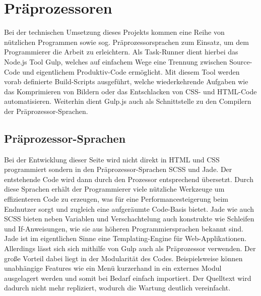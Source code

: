 \section{Präprozessoren}
Bei der technischen Umsetzung dieses Projekts kommen eine Reihe von nützlichen Programmen sowie sog. Präprozessorsprachen zum Einsatz, um dem Programmierer die Arbeit zu erleichtern.
Als Task-Runner dient hierbei das Node.js Tool Gulp, welches auf einfachem Wege eine Trennung zwischen Source-Code und eigentlichem Produktiv-Code ermöglicht. Mit diesem Tool werden vorab definierte Build-Scripts ausgeführt, welche wiederkehrende Aufgaben wie das Komprimieren von Bildern oder das Entschlacken von CSS- und HTML-Code automatisieren. Weiterhin dient Gulp.js auch als Schnittstelle zu den Compilern der Präprozessor-Sprachen.

\subsection{Präprozessor-Sprachen}
Bei der Entwicklung dieser Seite wird nicht direkt in HTML und CSS programmiert sondern in den Präprozessor-Sprachen SCSS und Jade. Der entstehende Code wird dann durch den Prozessor entsprechend übersetzt.
Durch diese Sprachen erhält der Programmierer viele nützliche Werkzeuge um effizienteren Code zu erzeugen, was für eine Performancesteigerung beim Endnutzer sorgt und zugleich eine aufgeräumte Code-Basis bietet.
Jade wie auch SCSS bieten neben Variablen und Verschachtelung auch konstrukte wie Schleifen und If-Anweisungen, wie sie aus höheren Programmiersprachen bekannt sind.
Jade ist im eigentlichen Sinne eine Templating-Engine für Web-Applikationen. Allerdings lässt sich sich mithilfe von Gulp auch als Präprozessor verwenden. Der große Vorteil dabei liegt in der Modularität des Codes. Beispielsweise können unabhängige Features wie ein Menü kurzerhand in ein externes Modul ausgelagert werden und somit bei Bedarf einfach importiert. Der Quelltext wird dadurch nicht mehr repliziert, wodurch die Wartung deutlich vereinfacht.

